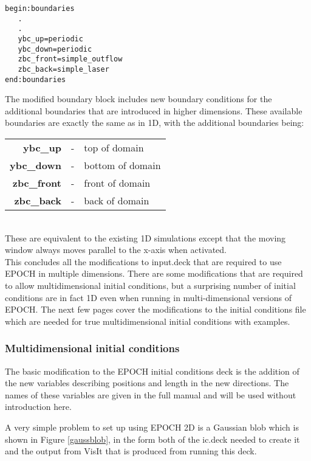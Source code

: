 \documentclass[12pt]{article}
\newcommand{\boxverbatim}[1]{\begin{Verbatim}[obeytabs=true,frame=single,
  framerule=0.5mm,rulecolor=\color{warwickmid},label=#1]}
\newcommand{\inlineemph}[1]{{\color{warwicklight} \bf{#1}}}
\newcommand{\nEPOCH}{{\color{warwickdark}\fontfamily{phv}\selectfont EPOCH}}
\newcommand{\EPOCH}{{\nEPOCH} }
\begin{document}
\boxverbatim{Changed boundaries block}
begin:boundaries
   .
   .
   ybc_up=periodic
   ybc_down=periodic
   zbc_front=simple_outflow
   zbc_back=simple_laser
end:boundaries
\end{Verbatim}

The modified boundary block includes new boundary conditions for the additional
boundaries that are introduced in higher dimensions. These available boundaries
are exactly the same as in 1D, with the additional boundaries being:\\

\begin{tabular}{rcl}
\inlineemph{ybc\_up}    &-& top of domain\\
\inlineemph{ybc\_down}  &-& bottom of domain\\
\inlineemph{zbc\_front} &-& front of domain\\
\inlineemph{zbc\_back}  &-& back of domain\\
\end{tabular} \\

These are equivalent to the existing 1D simulations except that the moving
window always moves parallel to the x-axis when activated.\\ This concludes all
the modifications to input.deck that are required to use \EPOCH in multiple
dimensions. There are some modifications that are required to allow
multidimensional initial conditions, but a surprising number of initial
conditions are in fact 1D even when running in multi-dimensional versions of
\nEPOCH. The next few pages cover the modifications to the initial conditions
file which are needed for true multidimensional initial conditions with
examples.

\subsubsection{Multidimensional initial conditions}

The basic modification to the \EPOCH initial conditions deck is the addition of
the new variables describing positions and length in the new directions. The
names of these variables are given in the full manual and will be used without
introduction here.

A very simple problem to set up using EPOCH 2D is a Gaussian blob which is
shown in Figure \ref{gaussblob}, in the form both of the ic.deck needed to
create it and the output from VisIt that is produced from running this deck.
\end{document}
